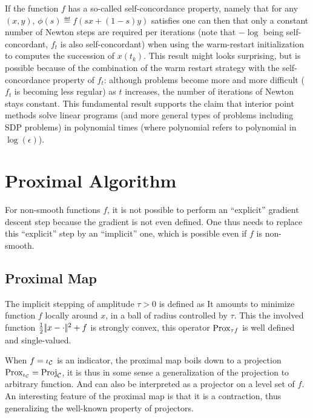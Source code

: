 If the function $f$ has a so-called self-concordance property, namely that for any $(x,y)$, $\phi(s) \eqdef f(s x + (1-s)y)$ satisfies
one can then that only a constant number of Newton steps are required per iterations (note that $-\log$ being self-concordant, $f_t$ is also self-concordant) when using the warm-restart initialization to computes the succession of $x(t_k)$. 
%
This result might looks surprising, but is possible because of the combination of the warm restart strategy with the self-concordance property of $f_t$: although problems become more and more difficult ($f_t$ is becoming less regular) as $t$ increases, the number of iterations of Newton stays constant.
%
This fundamental result supports the claim that interior point methods solve linear programs (and more general types of problems including SDP problems) in polynomial times (where polynomial refers to polynomial in $\log(\epsilon)$).


\section{Proximal Algorithm}

For non-smooth functions $f$, it is not possible to perform an ``explicit'' gradient descent step because the gradient is not even defined. One thus needs to replace this ``explicit''  step by an ``implicit'' one, which is possible even if $f$ is non-smooth.


\subsection{Proximal Map }

The implicit stepping of amplitude $\tau>0$ is defined as 
It amounts to minimize function $f$ locally around $x$, in a ball of radius controlled by $\tau$.
%
This the involved function $\frac{1}{2}|\!| x-\cdot |\!|^2 + f$ is strongly convex, this operator $\operatorname{Prox}_{\tau f}$ is well defined and single-valued. 

When $f=\iota_{\mathcal{C}}$ is an indicator, the proximal map boils down to a projection $\operatorname{Prox}_{\iota_{\mathcal{C}}}=\operatorname{Proj}_{\mathcal{C}}$, it is thus in some sense a generalization of the projection to arbitrary function. And can also be interpreted as a projector on a level set of $f$.  An interesting feature of the proximal map is that it is a contraction, thus generalizing the well-known property of projectors.

